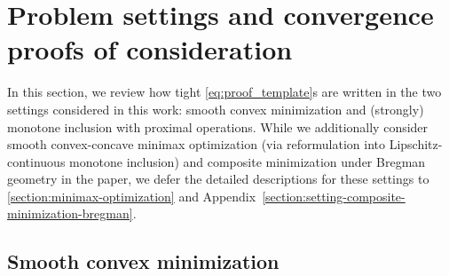 \documentclass{article}
\theoremstyle{definition}
\theoremstyle{plain}
\begin{document}
\section{Problem settings and convergence proofs of consideration}
\label{section:background}

In this section, we review how tight \ref{eq:proof_template}s are written in the two settings considered in this work: smooth convex minimization and (strongly) monotone inclusion with proximal operations.
While we additionally consider smooth convex-concave minimax optimization (via reformulation into Lipschitz-continuous monotone inclusion) and composite minimization under Bregman geometry in the paper, we defer the detailed descriptions for these settings to \ref{section:minimax-optimization} and Appendix~\ref{section:setting-composite-minimization-bregman}.

\subsection{Smooth convex minimization}
\label{section:setting-smooth-convex-minimization}
\end{document}
